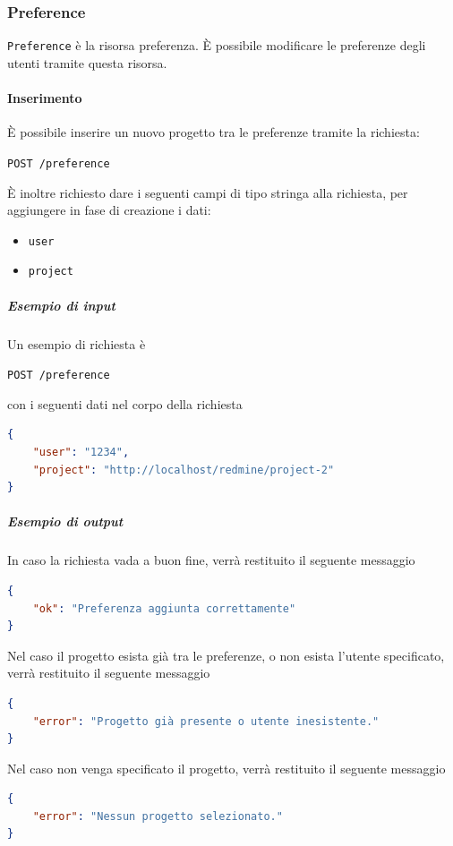 \subsubsection{Preference}

\texttt{Preference} è la risorsa preferenza.
È possibile modificare le preferenze degli utenti tramite questa risorsa.

\paragraph{Inserimento}
È possibile inserire un nuovo progetto tra le preferenze tramite la richiesta:
    \begin{center}
        \texttt{POST /preference}
    \end{center}

È inoltre richiesto dare i seguenti campi di tipo stringa alla richiesta, per aggiungere in fase di creazione i dati:
\begin{itemize}[noitemsep]
    \item \texttt{user}
    \item \texttt{project}
\end{itemize}

    \subparagraph{Esempio di input}
    Un esempio di richiesta è
        \begin{center}
            \texttt{POST  /preference}
        \end{center}
    con i seguenti dati nel corpo della richiesta
    \begin{lstlisting}[language = json]
{
    "user": "1234",
    "project": "http://localhost/redmine/project-2"
}
    \end{lstlisting}


    \subparagraph{Esempio di output}
    In caso la richiesta vada a buon fine, verrà restituito il seguente messaggio
    \begin{lstlisting}[language = json]
{
    "ok": "Preferenza aggiunta correttamente"
}
    \end{lstlisting}

    Nel caso il progetto esista già tra le preferenze, o non esista l'utente specificato, verrà restituito il seguente messaggio
    \begin{lstlisting}[language = json]
{
    "error": "Progetto già presente o utente inesistente."
}
    \end{lstlisting}

    Nel caso non venga specificato il progetto, verrà restituito il seguente messaggio
    \begin{lstlisting}[language = json]
{
    "error": "Nessun progetto selezionato."
}
    \end{lstlisting}


